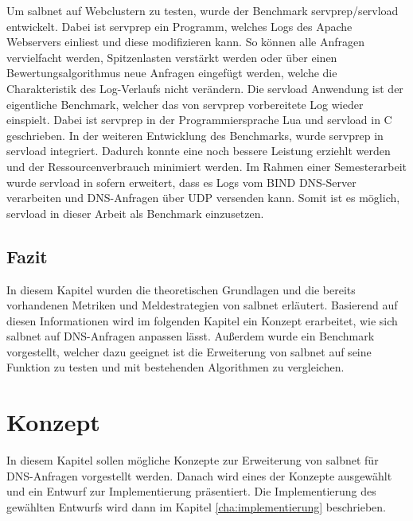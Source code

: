 \documentclass[a4paper, 12pt, BCOR10mm, DIV12, toc=bibliography, toc=listof, german]{scrbook}
\begin{document}
			Um salbnet auf Webclustern zu testen, wurde der Benchmark servprep/servload \cite{habenschuss2011}
			entwickelt. Dabei ist servprep ein Programm, welches Logs des Apache Webservers einliest und diese
			modifizieren kann. So können alle Anfragen vervielfacht werden, Spitzenlasten verstärkt werden
			oder über einen Bewertungsalgorithmus neue Anfragen eingefügt werden, welche die Charakteristik
			des Log-Verlaufs nicht verändern. Die servload Anwendung ist der eigentliche Benchmark, welcher
			das von servprep vorbereitete Log wieder einspielt. Dabei ist servprep in der Programmiersprache
			Lua und servload in C geschrieben. In der weiteren Entwicklung des Benchmarks, wurde servprep in
			servload integriert. Dadurch konnte eine noch bessere Leistung erziehlt werden und der
			Ressourcenverbrauch minimiert werden. Im Rahmen einer Semesterarbeit \cite{menski2012} wurde
			servload in sofern erweitert, dass es Logs vom BIND DNS-Server verarbeiten und DNS-Anfragen über
			UDP versenden kann. Somit ist es möglich, servload in dieser Arbeit als Benchmark einzusetzen.


		\section{Fazit} %
		\label{sub:salbnet-fazit}

			In diesem Kapitel wurden die theoretischen Grundlagen und die bereits vorhandenen Metriken und
			Meldestrategien von salbnet erläutert. Basierend auf diesen Informationen wird im folgenden
			Kapitel ein Konzept erarbeitet, wie sich salbnet auf DNS-Anfragen anpassen lässt. Außerdem wurde
			ein Benchmark vorgestellt, welcher dazu geeignet ist die Erweiterung von salbnet auf seine
			Funktion zu testen und mit bestehenden Algorithmen zu vergleichen.



	\chapter{Konzept} %
	\label{cha:konzept}

	In diesem Kapitel sollen mögliche Konzepte zur Erweiterung von salbnet für DNS-Anfragen
	vorgestellt werden. Danach wird eines der Konzepte ausgewählt und ein Entwurf zur Implementierung
	präsentiert. Die Implementierung des gewählten Entwurfs wird dann im Kapitel
	\ref{cha:implementierung} beschrieben.
\end{document}
